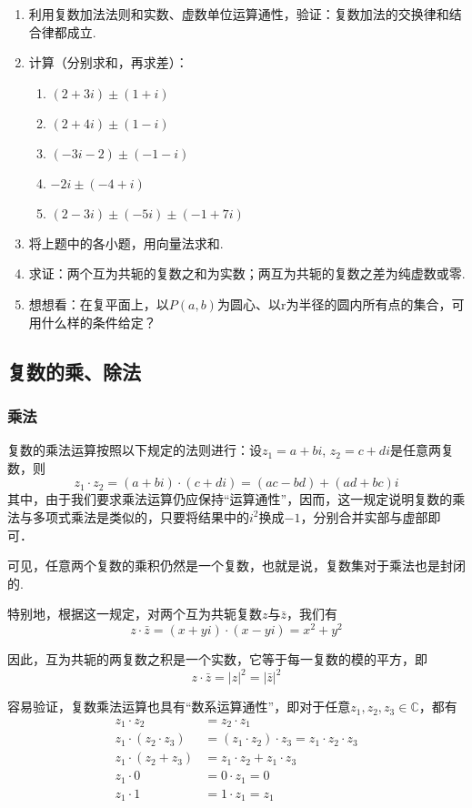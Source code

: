 \begin{ex}
\begin{enumerate}
    \item 利用复数加法法则和实数、虚数单位运算通性，验证：复数加法的交换律和结合律都成立.
    \item 计算（分别求和，再求差）：
\begin{multicols}{2}
\begin{enumerate}[(1)]
    \item $(2+3i)\pm (1+i)$
    \item $(2+4i)\pm (1-i)$
    \item $(-3i-2)\pm (-1-i)$
    \item $-2i\pm (-4+i)$
    \item $(2-3i)\pm (-5i)\pm(-1+7i)$
\end{enumerate}
\end{multicols}
\item 将上题中的各小题，用向量法求和.
\item 求证：两个互为共轭的复数之和为实数；两互为共轭的复数之差为纯虚数或零.
\item 想想看：在复平面上，以$P(a,b)$为圆心、以r为半径的圆内所有点的集合，可用什么样的条件给定？
\end{enumerate}
\end{ex}

\subsection{复数的乘、除法}
\subsubsection{乘法}
复数的乘法运算按照以下规定的法则进行：设$z_1=a+bi$, $z_2=c+di$是任意两复数，则
\[z_1\cdot z_2=(a+bi)\cdot (c+di)=(ac-bd)+(ad+bc)i\]
其中，由于我们要求乘法运算仍应保持“运算通性”，因而，这一规定说明复数的乘法与多项式乘法是类似的，只要将结果中的$i^2$换成$-1$，分别合并实部与虚部即可．

可见，任意两个复数的乘积仍然是一个复数，也就是说，复数集对于乘法也是封闭的.

特别地，根据这一规定，对两个互为共轭复数$z$与$\bar z$，我们有
\[z\cdot \bar z=(x+yi)\cdot (x-yi)=x^2+y^2\]

因此，互为共轭的两复数之积是一个实数，它等于每一复数的模的平方，即
\[z\cdot \bar z=|z|^2=|\bar z|^2\]

容易验证，复数乘法运算也具有“数系运算通性”，即对于任意$z_1,z_2,z_3\in\mathbb{C}$，都有
\begin{align}
z_1\cdot z_2  &= z_2\cdot z_1 \tag{乘法交换律成立}\\
z_1\cdot (z_2\cdot z_3)  &= (z_1\cdot z_2)\cdot z_3=z_1\cdot z_2\cdot z_3 \tag{乘法结合律成立}\\
z_1\cdot (z_2+ z_3)  &= z_1\cdot z_2+ z_1\cdot z_3 \tag{乘法对加法的分配律成立}\\
z_1\cdot 0  &= 0\cdot z_1=0 \tag{零的运算特性保持}\\
z_1\cdot 1  &= 1\cdot z_1=z_1 \tag{1的运算特性保持}
\end{align}

